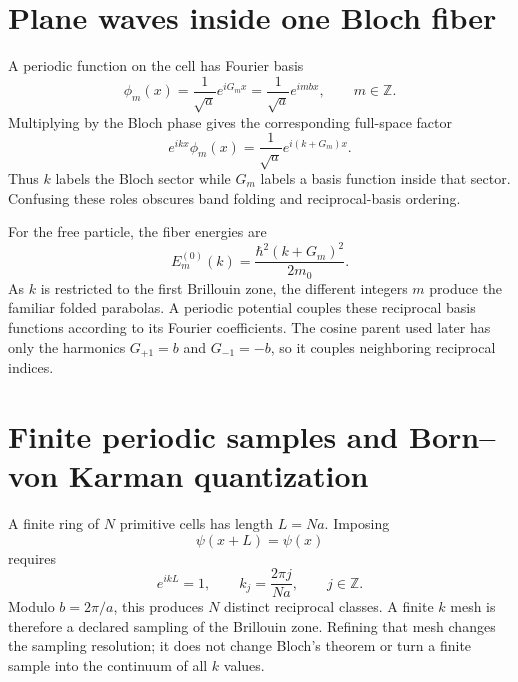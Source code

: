 \section{Plane waves inside one Bloch fiber}

A periodic function on the cell has Fourier basis
\begin{equation}
  \phi_m(x)=\frac{1}{\sqrt a}e^{iG_mx}
  =\frac{1}{\sqrt a}e^{imbx},
  \qquad m\in\mathbb Z.
  \label{eq:training-bloch-1d-cell-plane-wave}
\end{equation}
Multiplying by the Bloch phase gives the corresponding full-space factor
\begin{equation}
  e^{ikx}\phi_m(x)
  =\frac{1}{\sqrt a}e^{i(k+G_m)x}.
\end{equation}
Thus $k$ labels the Bloch sector while $G_m$ labels a basis function inside
that sector. Confusing these roles obscures band folding and reciprocal-basis
ordering.

For the free particle, the fiber energies are
\begin{equation}
  E_m^{(0)}(k)
  =\frac{\hbar^2(k+G_m)^2}{2m_0}.
  \label{eq:training-bloch-1d-free-folded-bands}
\end{equation}
As $k$ is restricted to the first Brillouin zone, the different integers $m$
produce the familiar folded parabolas. A periodic potential couples these
reciprocal basis functions according to its Fourier coefficients. The cosine
parent used later has only the harmonics $G_{+1}=b$ and $G_{-1}=-b$, so it
couples neighboring reciprocal indices.

\section{Finite periodic samples and Born--von Karman quantization}

A finite ring of $N$ primitive cells has length $L=Na$. Imposing
\begin{equation}
  \psi(x+L)=\psi(x)
\end{equation}
requires
\begin{equation}
  e^{ikL}=1,
  \qquad
  k_j=\frac{2\pi j}{Na},
  \qquad j\in\mathbb Z.
\end{equation}
Modulo $b=2\pi/a$, this produces $N$ distinct reciprocal classes. A finite
$k$ mesh is therefore a declared sampling of the Brillouin zone. Refining that
mesh changes the sampling resolution; it does not change Bloch's theorem or
turn a finite sample into the continuum of all $k$ values.

